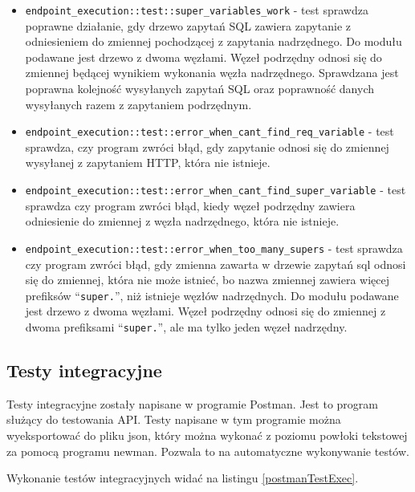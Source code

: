 \begin{itemize}
    \item \verb|endpoint_execution::test::super_variables_work| - test sprawdza
        poprawne działanie, gdy drzewo zapytań SQL zawiera zapytanie z
        odniesieniem do zmiennej pochodzącej z zapytania nadrzędnego. Do modułu
        podawane jest drzewo z dwoma węzłami. Węzeł podrzędny odnosi się do
        zmiennej będącej wynikiem wykonania węzła nadrzędnego. Sprawdzana jest
        poprawna kolejność wysyłanych zapytań SQL oraz poprawność danych
        wysyłanych razem z zapytaniem podrzędnym.

    \item \verb|endpoint_execution::test::error_when_cant_find_req_variable| -
        test sprawdza, czy program zwróci błąd, gdy zapytanie odnosi się do
        zmiennej wysyłanej z zapytaniem HTTP, która nie istnieje.

    \item \verb|endpoint_execution::test::error_when_cant_find_super_variable| -
        test sprawdza czy program zwróci błąd, kiedy węzeł podrzędny zawiera
        odniesienie do zmiennej z węzła nadrzędnego, która nie istnieje.

    \item \verb|endpoint_execution::test::error_when_too_many_supers| - test
        sprawdza czy program zwróci błąd, gdy zmienna zawarta w drzewie zapytań
        sql odnosi się do zmiennej, która nie może istnieć, bo nazwa zmiennej
        zawiera więcej prefiksów ``\verb|super.|'', niż istnieje węzłów
        nadrzędnych. Do modułu podawane jest drzewo z dwoma węzłami. Węzeł
        podrzędny odnosi się do zmiennej z dwoma prefiksami ``\verb|super.|'',
        ale ma tylko jeden węzeł nadrzędny.

\end{itemize}

\subsection{Testy integracyjne}

Testy integracyjne zostały napisane w programie Postman. Jest to program służący
do testowania API. Testy napisane w tym programie można wyeksportować do pliku
json, który można wykonać z poziomu powłoki tekstowej za pomocą programu
newman. Pozwala to na automatyczne wykonywanie testów.

Wykonanie testów integracyjnych widać na listingu \ref{postmanTestExec}.

% 


